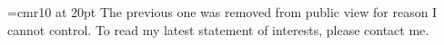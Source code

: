 \font\bigfont=cmr10 at 20pt
{\bigfont
The previous one was removed from public view for reason I cannot control. To
read my latest statement of interests, please contact me.
}
\bye
